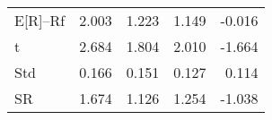\begin{tabular}{lrrrr}
\toprule
\midrule
E[R]--Rf & 2.003 & 1.223 & 1.149 & -0.016 \\
t & 2.684 & 1.804 & 2.010 & -1.664 \\
Std & 0.166 & 0.151 & 0.127 & 0.114 \\
SR & 1.674 & 1.126 & 1.254 & -1.038 \\
\bottomrule
\end{tabular}
